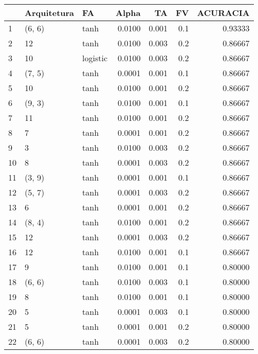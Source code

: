 \begin{tabular}{lllrrrr}
\toprule
{} & Arquitetura &        FA &   Alpha &     TA &   FV &  ACURACIA \\
\midrule
1   &      (6, 6) &      tanh &  0.0100 &  0.001 &  0.1 &   0.93333 \\
2   &          12 &      tanh &  0.0100 &  0.003 &  0.2 &   0.86667 \\
3   &          10 &  logistic &  0.0100 &  0.003 &  0.2 &   0.86667 \\
4   &      (7, 5) &      tanh &  0.0001 &  0.001 &  0.1 &   0.86667 \\
5   &          10 &      tanh &  0.0100 &  0.001 &  0.2 &   0.86667 \\
6   &      (9, 3) &      tanh &  0.0100 &  0.001 &  0.1 &   0.86667 \\
7   &          11 &      tanh &  0.0100 &  0.001 &  0.2 &   0.86667 \\
8   &           7 &      tanh &  0.0001 &  0.001 &  0.2 &   0.86667 \\
9   &           3 &      tanh &  0.0100 &  0.003 &  0.2 &   0.86667 \\
10  &           8 &      tanh &  0.0001 &  0.003 &  0.2 &   0.86667 \\
11  &      (3, 9) &      tanh &  0.0001 &  0.001 &  0.1 &   0.86667 \\
12  &      (5, 7) &      tanh &  0.0001 &  0.003 &  0.2 &   0.86667 \\
13  &           6 &      tanh &  0.0001 &  0.001 &  0.2 &   0.86667 \\
14  &      (8, 4) &      tanh &  0.0100 &  0.001 &  0.2 &   0.86667 \\
15  &          12 &      tanh &  0.0001 &  0.003 &  0.2 &   0.86667 \\
16  &          12 &      tanh &  0.0100 &  0.001 &  0.1 &   0.86667 \\
17  &           9 &      tanh &  0.0100 &  0.001 &  0.1 &   0.80000 \\
18  &      (6, 6) &      tanh &  0.0100 &  0.003 &  0.1 &   0.80000 \\
19  &           8 &      tanh &  0.0100 &  0.001 &  0.1 &   0.80000 \\
20  &           5 &      tanh &  0.0001 &  0.003 &  0.1 &   0.80000 \\
21  &           5 &      tanh &  0.0001 &  0.001 &  0.2 &   0.80000 \\
22  &      (6, 6) &      tanh &  0.0001 &  0.003 &  0.2 &   0.80000 \\

\end{tabular}

